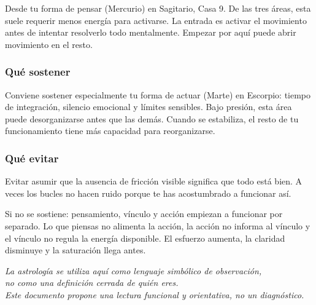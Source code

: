 \documentclass[11pt,a4paper]{article}
\begin{document}
\justifying
Desde tu forma de pensar (Mercurio) en Sagitario, Casa 9. De las tres áreas, esta suele requerir menos energía para activarse. La entrada es activar el movimiento antes de intentar resolverlo todo mentalmente. Empezar por aquí puede abrir movimiento en el resto.

\subsubsection*{Qué sostener}

\justifying
Conviene sostener especialmente tu forma de actuar (Marte) en Escorpio: tiempo de integración, silencio emocional y límites sensibles. Bajo presión, esta área puede desorganizarse antes que las demás. Cuando se estabiliza, el resto de tu funcionamiento tiene más capacidad para reorganizarse.

\subsubsection*{Qué evitar}

\justifying
Evitar asumir que la ausencia de fricción visible significa que todo está bien. A veces los bucles no hacen ruido porque te has acostumbrado a funcionar así.

\vspace{0.6cm}

\justifying
Si no se sostiene: pensamiento, vínculo y acción empiezan a funcionar por separado. Lo que piensas no alimenta la acción, la acción no informa al vínculo y el vínculo no regula la energía disponible. El esfuerzo aumenta, la claridad disminuye y la saturación llega antes.

\vspace{1.2cm}

\begin{center}
{\small\itshape\color{grisai}
La astrología se utiliza aquí como lenguaje simbólico de observación,\\
no como una definición cerrada de quién eres.\\[0.2cm]
Este documento propone una lectura funcional y orientativa, no un diagnóstico.
}
\end{center}
\end{document}

